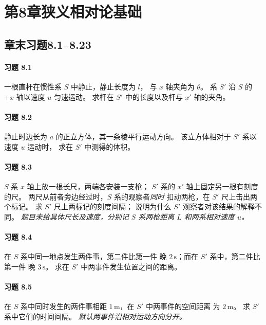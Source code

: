 \section*{第8章\quad 狭义相对论基础}
\subsection*{章末习题8.1--8.23}

\paragraph{习题 8.1}
一根直杆在惯性系 \(S\) 中静止，静止长度为 \(l\)，
与 \(x\) 轴夹角为 \(\theta\)。
系 \(S'\) 沿 \(S\) 的 \(+x\) 轴以速度 \(u\) 匀速运动。
求杆在 \(S'\) 中的长度以及杆与 \(x'\) 轴的夹角。

\paragraph{习题 8.2}
静止时边长为 \(a\) 的正立方体，其一条棱平行运动方向。
该立方体相对于 \(S'\) 系以速度 \(u\) 运动时，
求在 \(S'\) 中测得的体积。

\paragraph{习题 8.3}
\(S\) 系 \(x\) 轴上放一根长尺，两端各安装一支枪；
\(S'\) 系的 \(x'\) 轴上固定另一根有刻度的尺。
两尺从前者旁边经过时，\(S\) 系的观察者\emph{同时}
扣动两枪，在 \(S'\) 尺上击出两个标记。
求 \(S'\) 尺上两标记的刻度间隔；
说明为什么 \(S'\) 观察者对该结果的解释不同。
\textit{题目未给具体尺长及速度，分别记 \(S\) 系两枪距离
\(L\) 和两系相对速度 \(u\)。}

\paragraph{习题 8.4}
在 \(S\) 系中同一地点发生两件事，第二件比第一件
晚 \(2\,\mathrm s\)；而在 \(S'\) 系中，第二件比第一件
晚 \(3\,\mathrm s\)。
求在 \(S'\) 中两事件发生位置之间的距离。

\paragraph{习题 8.5}
在 \(S\) 系中同时发生的两件事相距
\(1\,\mathrm m\)，在 \(S'\) 中两事件的空间距离
为 \(2\,\mathrm m\)。
求 \(S'\) 系中它们的时间间隔。
\textit{默认两事件沿相对运动方向分开。}

